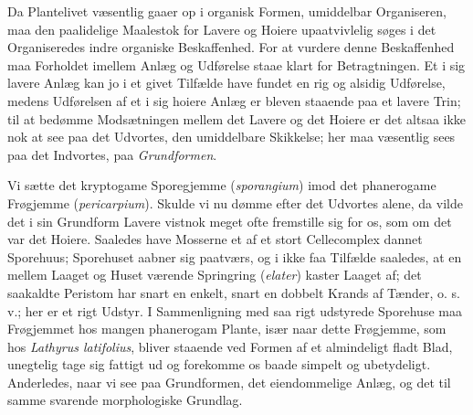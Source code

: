 \documentclass[11pt]{book}
\newcommand{\opage}[1]{\marginnote{\footnotesize\textit{[#1]}}}
\begin{document}
Da Plantelivet væsentlig gaaer op i organisk Formen, umiddelbar
Organiseren, maa den paalidelige Maalestok for Lavere og Hoiere
upaatvivlelig søges i det Organiseredes indre organiske Beskaffenhed.
For at vurdere denne Beskaffenhed maa Forholdet imellem Anlæg og
Udførelse staae klart for Betragtningen. Et i sig lavere Anlæg kan jo i
et givet Tilfælde have fundet en rig og alsidig Udførelse, medens
Udførelsen af et i sig hoiere Anlæg er bleven staaende paa et lavere
Trin; til at bedømme Modsætningen mellem det Lavere og det Hoiere er det
altsaa ikke nok at see paa det Udvortes, den umiddelbare Skikkelse; her
maa væsentlig sees paa det Indvortes, paa \emph{Grundformen}.

Vi sætte det kryptogame Sporegjemme (\textit{sporangium}) imod det
phanerogame Frøgjemme (\textit{pericarpium}). Skulde
\opage{294} \setcounter{footnote}{0}%
vi nu dømme efter det Udvortes alene, da vilde det i sin Grundform
Lavere vistnok meget ofte fremstille sig for os, som om det var det
Hoiere. Saaledes have Mosserne et af et stort Cellecomplex dannet
Sporehuus; Sporehuset aabner sig paatværs, og i ikke faa Tilfælde
saaledes, at en mellem Laaget og Huset værende Springring
(\textit{elater}) kaster Laaget af; det saakaldte Peristom har snart en
enkelt, snart en dobbelt Krands af Tænder, o. s. v.; her er et rigt
Udstyr. I Sammenligning med saa rigt udstyrede Sporehuse maa Frøgjemmet
hos mangen phanerogam Plante, især naar dette Frøgjemme, som hos
\textit{Lathyrus latifolius}, bliver staaende ved Formen af et
almindeligt fladt Blad, unegtelig tage sig fattigt ud og forekomme os
baade simpelt og ubetydeligt. Anderledes, naar vi see paa Grundformen,
det eiendommelige Anlæg, og det til samme svarende morphologiske
Grundlag.
\end{document}
